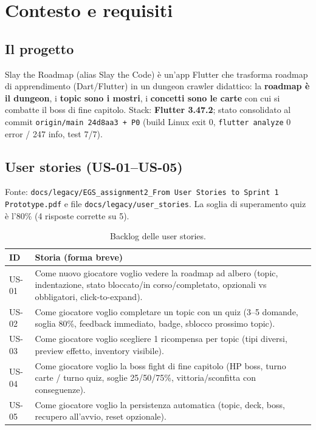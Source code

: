 \chapter{Contesto e requisiti}
\label{ch:contesto}

\section{Il progetto}
Slay the Roadmap (alias Slay the Code) è un'app Flutter che trasforma roadmap
di apprendimento (Dart/Flutter) in un dungeon crawler didattico: la
\textbf{roadmap è il dungeon}, i \textbf{topic sono i mostri}, i
\textbf{concetti sono le carte} con cui si combatte il boss di fine capitolo.
Stack: \textbf{Flutter 3.47.2}; stato consolidato al commit
\texttt{origin/main 24d8aa3 + P0} (build Linux exit 0, \texttt{flutter analyze}
0 error / 247 info, test 7/7).

\section{User stories (US-01--US-05)}
Fonte: \texttt{docs/legacy/EGS\_assignment2\_From User Stories to Sprint 1 Prototype.pdf}
e file \texttt{docs/legacy/user\_stories}. La soglia di superamento quiz è l'80\%
(4 risposte corrette su 5).

\begin{table}[h]
\centering
\begin{tabular}{@{}lp{9cm}@{}}
\toprule
ID & Storia (forma breve) \\
\midrule
US-01 & Come nuovo giocatore voglio vedere la roadmap ad albero (topic,
indentazione, stato bloccato/in corso/completato, opzionali vs obbligatori,
click-to-expand). \\
US-02 & Come giocatore voglio completare un topic con un quiz (3--5 domande,
soglia 80\%, feedback immediato, badge, sblocco prossimo topic). \\
US-03 & Come giocatore voglio scegliere 1 ricompensa per topic (tipi diversi,
preview effetto, inventory visibile). \\
US-04 & Come giocatore voglio la boss fight di fine capitolo (HP boss, turno
carte / turno quiz, soglie 25/50/75\%, vittoria/sconfitta con conseguenze). \\
US-05 & Come giocatore voglio la persistenza automatica (topic, deck, boss,
recupero all'avvio, reset opzionale). \\
\bottomrule
\end{tabular}
\caption{Backlog delle user stories.}
\label{tab:us}
\end{table}

